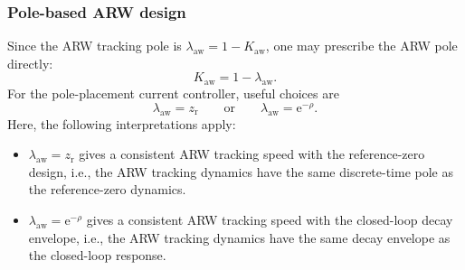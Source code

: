 \begin{frame}
    \frametitle{Pole-based ARW design}
    Since the ARW tracking pole is $\lambda_{\mathrm{aw}}    =
        1-K_{\mathrm{aw}}$, one may prescribe the ARW pole directly:
    \begin{equation}
        K_{\mathrm{aw}}
        =
        1-\lambda_{\mathrm{aw}}.
        \label{eq:arw_kaw_from_pole}
    \end{equation}\pause%
    For the pole-placement current controller, useful choices are
    \begin{equation}
        \lambda_{\mathrm{aw}}
        =
        z_{\mathrm{r}}
        \qquad\text{or}\qquad
        \lambda_{\mathrm{aw}}
        =
        \mathrm{e}^{-\rho}.
        \label{eq:arw_recommended_poles}
    \end{equation}\pause%
    Here, the following interpretations apply:
    \begin{itemize}
        \item $\lambda_{\mathrm{aw}}=z_{\mathrm{r}}$ gives a consistent ARW tracking speed with the reference-zero design, i.e., the ARW tracking dynamics have the same discrete-time pole as the reference-zero dynamics.\pause%
        \item $\lambda_{\mathrm{aw}}=\mathrm{e}^{-\rho}$ gives a consistent ARW tracking speed with the closed-loop decay envelope, i.e., the ARW tracking dynamics have the same decay envelope as the closed-loop response.
    \end{itemize}
\end{frame}

